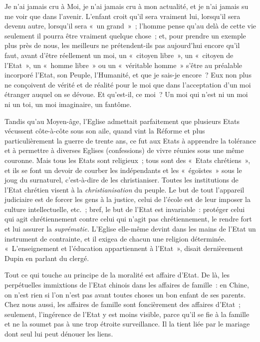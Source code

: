 \documentclass[french,twoside]{book} %
\begin{document}
Je n’ai jamais cru à Moi, je n’ai jamais cru à mon actualité, et je n’ai jamais su me voir que dans l’avenir. L’enfant croit qu’il sera vraiment lui, lorsqu’il sera devenu autre, lorsqu’il sera « un grand » ; l’homme pense qu’au delà de cette vie seulement il pourra être vraiment quelque chose ; et, pour prendre un exemple plus près de nous, les meilleurs ne prétendent-ils pas aujourd’hui  encore qu’il faut, avant d’être réellement un moi, un « citoyen libre », un « citoyen de l’Etat », un « homme libre » ou un « véritable homme » s’être au préalable incorporé l’Etat, son Peuple, l’Humanité, et que je sais-je encore ? Eux non plus ne conçoivent de vérité et de réalité pour le moi que dans l’acceptation d’un moi étranger auquel on se dévoue. Et qu’est-il, ce moi ? Un moi qui n’est ni un moi ni un toi, un moi imaginaire, un fantôme.\par
Tandis qu’au Moyen-âge, l’Eglise admettait parfaitement que plusieurs Etats vécussent côte-à-côte sous son aile, quand vint la Réforme et plus particulièrement la guerre de trente ans, ce fut aux Etats à apprendre la tolérance et à permettre à diverses Eglises (confessions) de vivre réunies sous une même couronne. Mais tous les Etats sont religieux ; tous sont des « Etats chrétiens », et ils se font un devoir de courber les indépendants et les « égoïstes » sous le joug du surnaturel, c’est-à-dire de les christianiser. Toutes les institutions de l’Etat chrétien visent à la \emph{christianisation} du peuple. Le but de tout l’appareil judiciaire est de forcer les gens à la justice, celui de l’école est de leur imposer la culture intellectuelle, etc. ; bref, le but de l’Etat est invariable : protéger celui qui agit chrétiennement contre celui qui n’agit pas chrétiennement, le rendre fort et lui assurer la \emph{suprématie. }L’Eglise elle-même devint dans les mains de l’Etat un instrument de contrainte, et il exigea de chacun une religion déterminée. « L’enseignement et l’éducation appartiennent à l’Etat », disait dernièrement Dupin en parlant du clergé.\par
Tout ce qui touche au principe de la moralité est affaire d’Etat. De là, les perpétuelles immixtions de l’Etat chinois dans les affaires de famille : en Chine, on n’est rien si l’on n’est pas avant toutes choses un bon enfant de ses parents. Chez nous aussi, les affaires de famille sont foncièrement des affaires d’Etat ; seulement, l’ingérence de l’Etat y est moins visible, parce  qu’il se fie à la famille et ne la soumet pas à une trop étroite surveillance. Il la tient liée par le mariage dont seul lui peut dénouer les liens.\par
\end{document}
